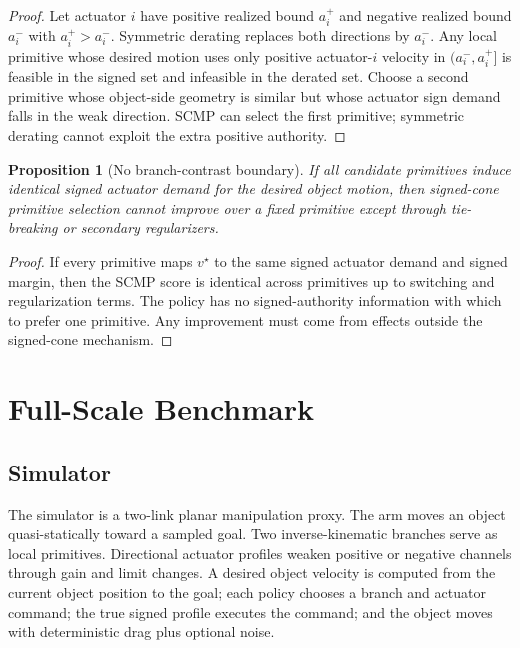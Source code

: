 \documentclass{article}
\newtheorem{proposition}{Proposition}
\begin{document}
\begin{proof}
Let actuator $i$ have positive realized bound $a_i^+$ and negative realized bound $a_i^-$ with $a_i^+>a_i^-$. Symmetric derating replaces both directions by $a_i^-$. Any local primitive whose desired motion uses only positive actuator-$i$ velocity in $(a_i^-,a_i^+]$ is feasible in the signed set and infeasible in the derated set. Choose a second primitive whose object-side geometry is similar but whose actuator sign demand falls in the weak direction. SCMP can select the first primitive; symmetric derating cannot exploit the extra positive authority.
\end{proof}

\begin{proposition}[No branch-contrast boundary]
If all candidate primitives induce identical signed actuator demand for the desired object motion, then signed-cone primitive selection cannot improve over a fixed primitive except through tie-breaking or secondary regularizers.
\end{proposition}

\begin{proof}
If every primitive maps $v^\star$ to the same signed actuator demand and signed margin, then the SCMP score is identical across primitives up to switching and regularization terms. The policy has no signed-authority information with which to prefer one primitive. Any improvement must come from effects outside the signed-cone mechanism.
\end{proof}

\section{Full-Scale Benchmark}

\subsection{Simulator}

The simulator is a two-link planar manipulation proxy. The arm moves an object quasi-statically toward a sampled goal. Two inverse-kinematic branches serve as local primitives. Directional actuator profiles weaken positive or negative channels through gain and limit changes. A desired object velocity is computed from the current object position to the goal; each policy chooses a branch and actuator command; the true signed profile executes the command; and the object moves with deterministic drag plus optional noise.
\end{document}
